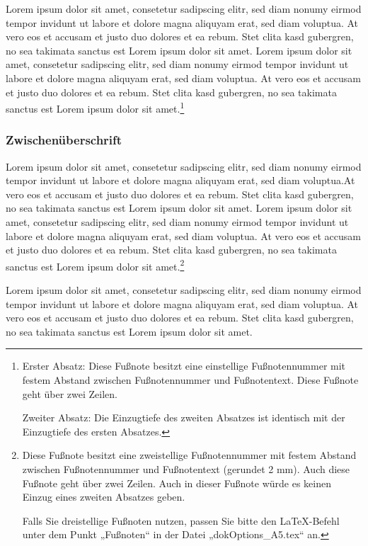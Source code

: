 Lorem ipsum dolor sit amet, consetetur sadipscing elitr, sed diam nonumy eirmod tempor invidunt ut labore et dolore magna aliquyam erat, sed diam voluptua. At vero eos et accusam et justo duo dolores et ea rebum. Stet clita kasd gubergren, no sea takimata sanctus est Lorem ipsum dolor sit amet. Lorem ipsum dolor sit amet, consetetur sadipscing elitr, sed diam nonumy eirmod tempor invidunt ut labore et dolore magna aliquyam erat, sed diam voluptua. At vero eos et accusam et justo duo dolores et ea rebum. Stet clita kasd gubergren, no sea takimata sanctus est Lorem ipsum dolor sit amet.\footnote{
	Erster Absatz: Diese Fußnote besitzt eine einstellige Fußnotennummer mit festem Abstand zwischen Fußnotennummer und Fußnotentext. Diese Fußnote geht über zwei Zeilen.
	
	Zweiter Absatz: Die Einzugtiefe des zweiten Absatzes ist identisch mit der Einzugtiefe des ersten Absatzes.
} %

\subsubsection*{Zwischenüberschrift}
Lorem ipsum dolor sit amet, consetetur sadipscing elitr, sed diam nonumy eirmod tempor invidunt ut labore et dolore magna aliquyam erat, sed diam voluptua.At vero eos et accusam et justo duo dolores et ea rebum. Stet clita kasd gubergren, no sea takimata sanctus est Lorem ipsum dolor sit amet. Lorem ipsum dolor sit amet, consetetur sadipscing elitr, sed diam nonumy eirmod tempor invidunt ut labore et dolore magna aliquyam erat, sed diam voluptua. At vero eos et accusam et justo duo dolores et ea rebum. Stet clita kasd gubergren, no sea takimata sanctus est Lorem ipsum dolor sit amet.\footnote[13]{
	Diese Fußnote besitzt eine zweistellige Fußnotennummer mit festem Abstand zwischen Fußnotennummer und Fußnotentext (gerundet 2 mm). Auch diese Fußnote geht über zwei Zeilen. Auch in dieser Fußnote würde es keinen Einzug eines zweiten Absatzes geben. 
	
	Falls Sie dreistellige Fußnoten nutzen, passen Sie bitte den LaTeX-Befehl unter dem Punkt „Fußnoten“ in der Datei „dokOptions\_A5.tex“ an.
} %

Lorem ipsum dolor sit amet, consetetur sadipscing elitr, sed diam nonumy eirmod tempor invidunt ut labore et dolore magna aliquyam erat, sed diam voluptua. At vero eos et accusam et justo duo dolores et ea rebum. Stet clita kasd gubergren, no sea takimata sanctus est Lorem ipsum dolor sit amet.

